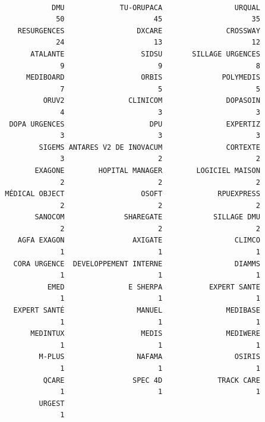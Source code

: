 \documentclass[]{article}
\begin{document}
\begin{verbatim}

                   DMU             TU-ORUPACA                 URQUAL 
                    50                     45                     35 
           RESURGENCES                 DXCARE               CROSSWAY 
                    24                     13                     12 
              ATALANTE                  SIDSU       SILLAGE URGENCES 
                     9                      9                      8 
             MEDIBOARD                  ORBIS              POLYMEDIS 
                     7                      5                      5 
                 ORUV2               CLINICOM               DOPASOIN 
                     4                      3                      3 
         DOPA URGENCES                    DPU               EXPERTIZ 
                     3                      3                      3 
                SIGEMS ANTARES V2 DE INOVACUM               CORTEXTE 
                     3                      2                      2 
               EXAGONE        HOPITAL MANAGER        LOGICIEL MAISON 
                     2                      2                      2 
        MÉDICAL OBJECT                  OSOFT             RPUEXPRESS 
                     2                      2                      2 
               SANOCOM              SHAREGATE            SILLAGE DMU 
                     2                      2                      2 
           AGFA EXAGON                AXIGATE                 CLIMCO 
                     1                      1                      1 
          CORA URGENCE  DEVELOPPEMENT INTERNE                 DIAMMS 
                     1                      1                      1 
                  EMED               E SHERPA           EXPERT SANTE 
                     1                      1                      1 
          EXPERT SANTÉ                 MANUEL               MEDIBASE 
                     1                      1                      1 
              MEDINTUX                  MEDIS               MEDIWERE 
                     1                      1                      1 
                M-PLUS                 NAFAMA                 OSIRIS 
                     1                      1                      1 
                 QCARE                SPEC 4D             TRACK CARE 
                     1                      1                      1 
                URGEST 
                     1 
\end{verbatim}
\end{document}
